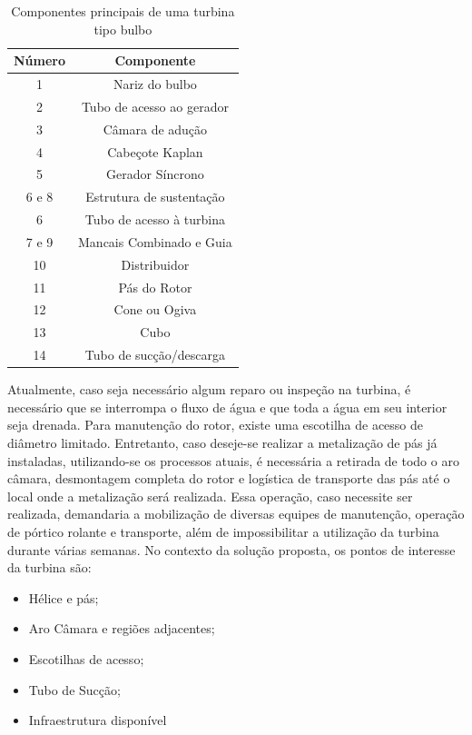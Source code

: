 \begin{table}[h!]
\centering
\begin{tabular}{  c | c  }
  \hline
  \textbf{Número} & \textbf{Componente} \\ \hline
  1 & Nariz do bulbo \\ \hline
  2 & Tubo de acesso ao gerador  \\ \hline
  3 & Câmara de adução  \\ \hline
  4 & Cabeçote Kaplan  \\ \hline
  5 & Gerador Síncrono  \\ \hline
  6 e 8 & Estrutura de sustentação \\ \hline
  6 & Tubo de acesso à turbina \\ \hline
  7 e 9 & Mancais Combinado e Guia \\ \hline
  10 & Distribuidor \\ \hline
  11 & Pás do Rotor \\ \hline
  12 & Cone ou Ogiva \\ \hline
  13 & Cubo \\ \hline
  14 & Tubo de sucção/descarga \\
  \hline
\end{tabular}
\caption{Componentes principais de uma turbina tipo bulbo}
\label{tab::bulb_turbine}
\end{table}

Atualmente, caso seja necessário algum reparo ou inspeção na turbina, é necessário que se interrompa o fluxo de água e que 
toda a água em seu interior seja drenada. Para manutenção do rotor, existe uma escotilha de acesso de diâmetro limitado. Entretanto, caso deseje-se realizar 
a metalização de pás já instaladas, utilizando-se os processos atuais, é
necessária a retirada de todo o aro câmara, desmontagem completa do rotor e logística de transporte das pás até o local
onde a metalização será realizada. Essa operação, caso necessite ser realizada, demandaria a mobilização
de diversas equipes de manutenção, operação de pórtico rolante e transporte,
além de impossibilitar a utilização da turbina durante várias semanas.
No contexto da solução proposta, os pontos de interesse da turbina são:

\begin{itemize}
  \item Hélice e pás;
  \item Aro Câmara e regiões adjacentes;
  \item Escotilhas de acesso;
  \item Tubo de Sucção;
  \item Infraestrutura disponível
\end{itemize} 

